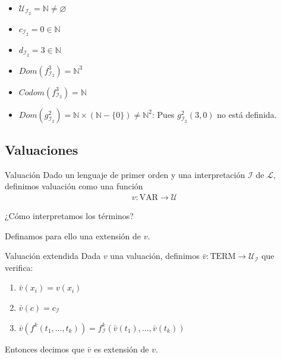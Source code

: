 \begin{enumerate}
    \begin{itemize}[label=\cmark]
        \item $\mathcal{U}_{\mathcal{I}_2} = \mathbb{N} \neq \varnothing$
        \item  $c_{\mathcal{I}_2} = 0 \in \mathbb{N}$
        \item  $d_{\mathcal{I}_2} = 3 \in \mathbb{N}$
        \item  $Dom(f_{\mathcal{I}_2}^3) = \mathbb{N}^3$
        \item  $Codom(f_{\mathcal{I}_2}^3) = \mathbb{N}$
        \item[\xmark]  $Dom(g_{\mathcal{I}_2}^2) 
            = \mathbb{N} \times \left(\mathbb{N} - \{ 0 \}\right)
            \neq \mathbb{N}^2$: 
            Pues $g_{\mathcal{I}_2}^{2}(3,0)$ no está definida.
    \end{itemize}
\end{enumerate}

\subsection{Valuaciones}

\begin{definicion}{Valuación}{}
    Dado un lenguaje de primer orden y una interpretación $\mathcal{I}$ de
    $\mathcal{L}$, definimos valuación como una función 
    \begin{gather*}
        v: \mathrm{VAR} \to \mathcal{U}
    \end{gather*}
\end{definicion}

\medskip

¿Cómo interpretamos los términos?

Definamos para ello una extensión de $v$.

\begin{definicion}{Valuación extendida}{}
    Dada $v$ una valuación, definimos
    $\bar{v}: \mathrm{TERM} \to \mathcal{U}_{\mathcal{I}}$ 
    que verifica:

    \begin{enumerate}
        \item $\bar{v} (x_i) = v(x_i)$ 
        \item $\bar{v}(c) = c_{\mathcal{I}}$ 
        \item $\bar{v}( f^{k}(t_1, \dotsc, t_k)) = 
            f_{\mathcal{I}}^{k}(\bar{v}(t_1), \dotsc, \bar{v}(t_k))$
    \end{enumerate}

    Entonces decimos que $\bar{v}$ es extensión de $v$.
\end{definicion}

